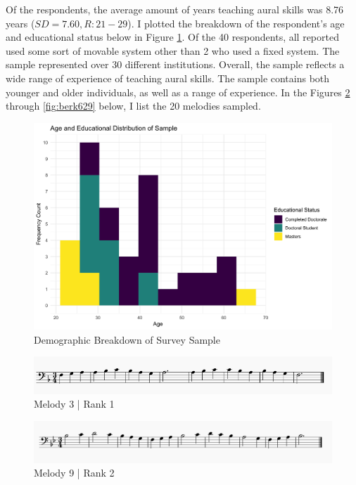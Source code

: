 \documentclass[12pt,]{book}
\begin{document}
Of the respondents, the average amount of years teaching aural skills was 8.76 years (\(SD = 7.60, R: 21-29\)).
I plotted the breakdown of the respondent's age and educational status below in Figure \ref{fig:surveyageeducation}.
Of the 40 respondents, all reported used some sort of movable system other than 2 who used a fixed system.
The sample represented over 30 different institutions.
Overall, the sample reflects a wide range of experience of teaching aural skills.
The sample contains both younger and older individuals, as well as a range of experience.
In the Figures \ref{fig:berk3} through \ref{fig:berk629} below, I list the 20 melodies sampled.

\begin{figure}

{\centering \includegraphics[width=0.8\linewidth]{img/ageedsurveydistribution} 

}

\caption{Demographic Breakdown of Survey Sample}\label{fig:surveyageeducation}
\end{figure}

\begin{figure}

{\centering \includegraphics[width=1\linewidth]{img/survey_melodies/Berkowitz3} 

}

\caption{Melody 3   | Rank 1}\label{fig:berk3}
\end{figure}

\begin{figure}

{\centering \includegraphics[width=1\linewidth]{img/survey_melodies/Berkowitz9} 

}

\caption{Melody  9  | Rank 2}\label{fig:berk9}
\end{figure}
\end{document}
